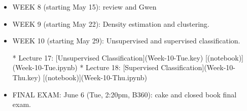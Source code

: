 \documentclass[10pt]{article}
\begin{document}
\begin{itemize}
\item WEEK  8 (starting May 15):  review and Gwen 



\item WEEK  9 (starting May 22):  Density estimation and clustering.







\item WEEK  10 (starting May 29):  Unsupervised and supervised classification.


 * Lecture 17: [Unsupervised Classification](Week-10-Tue.key) [(notebook)](Week-10-Tue.ipynb)
 * Lecture 18: [Supervised Classification](Week-10-Thu.key) [(notebook)](Week-10-Thu.ipynb)



\item FINAL EXAM: June 6 (Tue, 2:20pm, B360): cake and closed book final exam.

\end{itemize}
\end{document}
